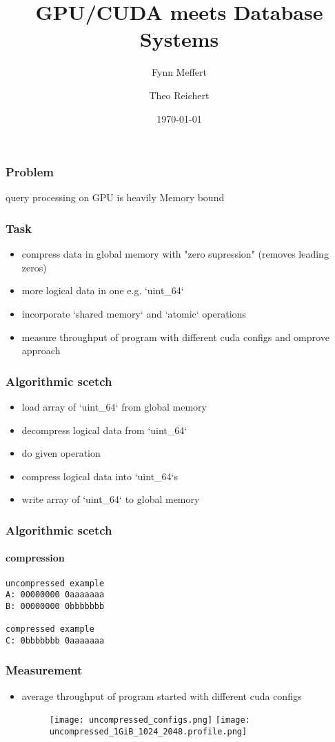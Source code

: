 \documentclass{beamer}
\title{GPU/CUDA meets Database Systems}
\author{Fynn Meffert \and Theo Reichert}
\date{\today}
\begin{document}
\frame{\titlepage}

\begin{frame}
    \frametitle{Problem}
    query processing on GPU is heavily Memory bound
\end{frame}

\begin{frame}
    \frametitle{Task}
    \begin{itemize}
        \item compress data in global memory with "zero supression"
          (removes leading zeros)
        \item more logical data in one e.g. `uint\_64`
        \item incorporate `shared memory` and `atomic` operations
        \item measure throughput of program with different cuda configs
          and omprove approach
     \end{itemize}
\end{frame}


\begin{frame}
    \frametitle{Algorithmic scetch}
    \begin{itemize}
        \item load array of `uint\_64` from global memory
        \item decompress logical data from `uint\_64`
        \item do given operation
        \item compress logical data into `uint\_64`s
        \item write array of `uint\_64` to global memory
     \end{itemize}
\end{frame}

\begin{frame}[fragile]
    \frametitle{Algorithmic scetch}
    \framesubtitle{compression}
    \begin{lstlisting}
uncompressed example
A: 00000000 0aaaaaaa
B: 00000000 0bbbbbbb

compressed example
C: 0bbbbbbb 0aaaaaaa
    \end{lstlisting}
\end{frame}


\begin{frame}
    \frametitle{Measurement}
    \begin{itemize}
        \item average throughput of program started with different cuda configs
         \begin{figure}
             \centering
             \texttt{[image: uncompressed\_configs.png]} %
             \texttt{[image: uncompressed\_1GiB\_1024\_2048.profile.png]} %
         \end{figure}
    \end{itemize}
\end{frame}
\end{document}
